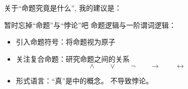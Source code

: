 \begin{frame}{关于``命题究竟是什么'', 我的建议是：}
\end{frame}

\begin{frame}{暂时忘掉``命题''与``悖论''吧}
  命题逻辑与一阶谓词逻辑：
  \begin{itemize}
    \item 引入命题符号：将命题视为原子
    \item 关注复合命题：研究命题之间的关系 
      \[
	\land \qquad \lor \qquad \lnot \qquad \to \qquad \leftrightarrow
      \]
    \item 形式语言：``真''是中的概念。 不导致悖论。
  \end{itemize}
\end{frame}
